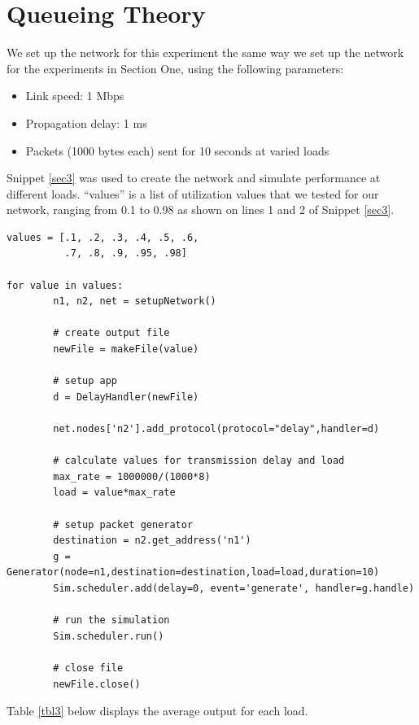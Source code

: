 \documentclass[11pt]{article}
\begin{document}
\section{Queueing Theory}

We set up the network for this experiment the same way we set up the network for the experiments in Section One, using the following parameters:

\begin{itemize}
\item Link speed: 1 Mbps
\item Propagation delay: 1 ms
\item Packets (1000 bytes each) sent for 10 seconds at varied loads 
\end{itemize}

\medskip

Snippet \ref{sec3} was used to create the network and simulate performance at different loads. ``values'' is a list of utilization values that we tested for our network, ranging from 0.1 to 0.98 as shown on lines 1 and 2 of Snippet \ref{sec3}.

\medskip

\begin{lstlisting}[caption={Network 3},label=sec3]
values = [.1, .2, .3, .4, .5, .6,
          .7, .8, .9, .95, .98]

for value in values:
        n1, n2, net = setupNetwork()

        # create output file
        newFile = makeFile(value)

        # setup app
        d = DelayHandler(newFile)

        net.nodes['n2'].add_protocol(protocol="delay",handler=d)

        # calculate values for transmission delay and load
        max_rate = 1000000/(1000*8)
        load = value*max_rate

        # setup packet generator
        destination = n2.get_address('n1')
        g = Generator(node=n1,destination=destination,load=load,duration=10)
        Sim.scheduler.add(delay=0, event='generate', handler=g.handle)
        
        # run the simulation
        Sim.scheduler.run()

        # close file
        newFile.close()
\end{lstlisting}

Table \ref{tbl3} below displays the average output for each load.
\end{document}
